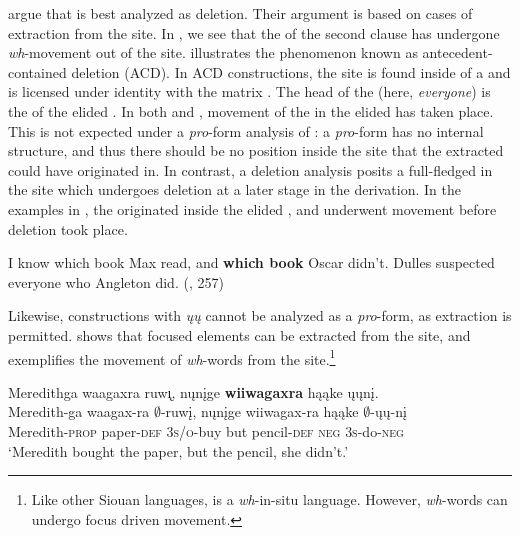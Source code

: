 \documentclass[output=paper]{LSP/langsci}
\begin{document}
{{\citet{FiengoMay1994} argue that   is best analyzed as  deletion. Their argument is based on cases of  extraction from the  site. In , we see that the  of the second clause has undergone \emph{wh}-movement out of the  site.  illustrates the phenomenon known as antecedent-contained deletion (ACD). In ACD constructions, the  site is found inside of a  and is licensed under identity with the matrix . The head of the  (here, \emph{everyone}) is the  of the elided . In both  and , movement of the  in the elided  has taken place. This is not expected under a \emph{pro}-form analysis of : a \emph{pro}-form has no internal structure, and thus there should be no  position inside the  site that the extracted  could have originated in. In contrast, a deletion analysis posits a full-fledged  in the  site which undergoes deletion at a later stage in the derivation. In the examples in , the  originated inside the elided , and underwent movement before deletion took place.
 
\ea\label{ex:johnson:46}
\ea\label{ex:johnson:46a}
I know which book Max read, and \textbf{which book} Oscar didn't.
\ex\label{ex:johnson:46b} 
Dulles suspected everyone who Angleton did. (\citealt[229]{FiengoMay1994}, 257)
\z
\z

Likewise,  constructions with \emph{ųų} cannot be analyzed as a \emph{pro}-form, as  extraction is permitted.  shows that focused elements can be extracted from the  site, and  exemplifies the movement of \emph{wh}-words from the  site.\footnote{Like other Siouan languages,  is a \emph{wh}-in-situ language. However, \emph{wh}-words can undergo focus driven movement.}
 
\ea
\ea\label{ex:johnson:47a} 
\glll Meredithga waagaxra ruw\k{\i}, nųnįge \textbf{wiiwagaxra} hąąke ųųnį.\\
Meredith-ga waagax-ra $\emptyset$-ruwį, nųnįge wiiwagax-ra hąąke $\emptyset$-ųų-nį\\
Meredith-\textsc{prop} paper-\textsc{def} \textsc{3s/o}-buy but pencil-\textsc{def} \textsc{neg} \textsc{3s}-do-\textsc{neg}\\
\trans `Meredith bought the paper, but the pencil, she didn't.'
 
}}
\end{document}
